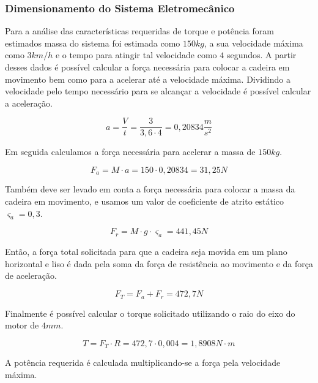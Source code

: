 \subsubsection{Dimensionamento do Sistema Eletromecânico}

Para a análise das características requeridas de torque e potência foram estimados
massa do 
sistema foi estimada como $150 kg$, a sua velocidade máxima 
como $3 km/h$
e o tempo para atingir tal velocidade como $4$ segundos. 
A partir desses dados é
possível 
calcular a força necessária para colocar a cadeira em movimento 
bem como
para a acelerar até a velocidade máxima. Dividindo a velocidade pelo tempo necessário
para se alcançar a velocidade é possível calcular a aceleração.

\begin{equation}
a = \frac{V}{t} = \frac{3}{3,6\cdot 4} = 0,20834  \frac{m}{s^2}
\end{equation}

Em seguida calculamos a força necessária para acelerar a massa de $150 kg$.

\begin{equation}
F_{a} = M \cdot a = 150 \cdot 0,20834 = 31,25 N
\end{equation}

Também deve ser levado em conta a força necessária para colocar 
a massa da cadeira
em movimento, 
e usamos um valor de coeficiente de atrito estático $\varsigma_{a} = 0,3$.

\begin{equation}
F_{r} = M \cdot g \cdot \varsigma_{a} = 441,45 N
\end{equation}

Então, a força total solicitada para que a cadeira seja movida 
em um plano 
horizontal e liso é dada pela soma da força de resistência ao 
movimento e da força de aceleração.

\begin{equation}
F_{T} = F_{a} + F_{r} = 472,7 N
\end{equation}

Finalmente é possível calcular o torque solicitado utilizando o raio do eixo do
motor de $4mm$.

\begin{equation}
T = F_{T} \cdot R = 472,7 \cdot 0,004 = 1,8908 N\cdot m
\end{equation}

A potência requerida é calculada multiplicando-se a força pela velocidade máxima.


